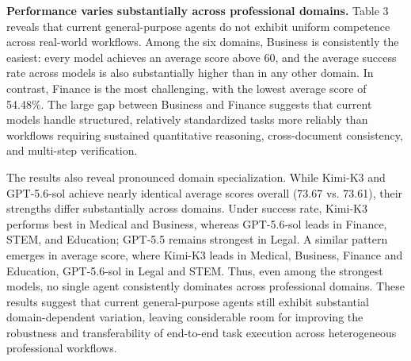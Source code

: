 \textbf{Performance varies substantially across professional domains.} Table 3 reveals that current general-purpose agents do not exhibit uniform competence across real-world workflows. Among the six domains, Business is consistently the easiest: every model achieves an average score above 60, and the average success rate across models is also substantially higher than in any other domain. In contrast, Finance is the most challenging, with the lowest average score of 54.48\%. The large gap between Business and Finance suggests that current models handle structured, relatively standardized tasks more reliably than workflows requiring sustained quantitative reasoning, cross-document consistency, and multi-step verification.

The results also reveal pronounced domain specialization. While Kimi-K3 and GPT-5.6-sol achieve nearly identical average scores overall (73.67 vs. 73.61), their strengths differ substantially across domains. Under success rate, Kimi-K3 performs best in Medical and Business, whereas GPT-5.6-sol leads in Finance, STEM, and Education; GPT-5.5 remains strongest in Legal. A similar pattern emerges in average score, where Kimi-K3 leads in Medical, Business, Finance and Education, GPT-5.6-sol in Legal and STEM. Thus, even among the strongest models, no single agent consistently dominates across professional domains. These results suggest that current general-purpose agents still exhibit substantial domain-dependent variation, leaving considerable room for improving the robustness and transferability of end-to-end task execution across heterogeneous professional workflows.



